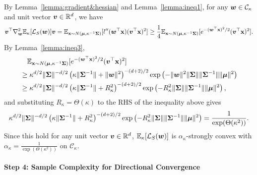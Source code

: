By Lemma~\ref{lemma:gradient&hessian} and Lemma~\ref{lemma:ineq1}, for any ${\bm{w}} \in \mathcal{C}_\kappa$ and unit vector ${\bm{v}} \in \mathbb{R}^{d}$, we have
\begin{equation*}
    {\bm{v}}^\top \nabla^2_{\bm{w}} \mathbb{E}_\kappa[\mathcal{L}_S({\bm{w}})] {\bm{v}} = \mathbb{E}_{{\mathbf{x}} \sim N({\bm{\mu}}, \kappa^{-1} {\bm{\Sigma}})}[l''({\bm{w}}^\top {\mathbf{x}}) ({\bm{v}}^\top {\mathbf{x}})^2]
    \geq \frac{1}{4} \mathbb{E}_{{\mathbf{x}} \sim N({\bm{\mu}}, \kappa^{-1}{\bm{\Sigma}})}[e^{-({\bm{w}}^\top {\mathbf{x}})^2/2}({\bm{v}}^\top {\mathbf{x}})^2].
\end{equation*}
By Lemma~\ref{lemma:ineq3}, 
\begin{align*}
    &\quad \mathbb{E}_{{\mathbf{x}} \sim N({\bm{\mu}}, \kappa^{-1}{\bm{\Sigma}})}[e^{-({\bm{w}}^\top {\mathbf{x}})^2/2}({\bm{v}}^\top {\mathbf{x}})^2]\\
    &\geq \kappa^{d/2}\lVert {\bm{\Sigma}} \rVert ^{-d/2} \left (\kappa \lVert{\bm{\Sigma}}^{-1}\rVert + \lVert {\bm{w}}\rVert^2 \right )^{-(d+2)/2} \exp \left (-\lVert {\bm{w}}\rVert^2 \lVert {\bm{\Sigma}} \rVert \lVert {\bm{\Sigma}}^{-1} \rVert \lVert {\bm{\mu}}\rVert^2 \right )\\
    &\geq \kappa^{d/2}\lVert {\bm{\Sigma}} \rVert ^{-d/2} \left (\kappa \lVert {\bm{\Sigma}}^{-1} \rVert + R_\kappa^2 \right )^{-(d+2)/2} \exp \left (-R_\kappa^2 \lVert {\bm{\Sigma}} \rVert \lVert {\bm{\Sigma}}^{-1} \rVert \lVert {\bm{\mu}}\rVert^2 \right ),
\end{align*}
and substituting $R_\kappa = \Theta (\kappa)$ to the RHS of the inequality above gives
\begin{equation*}
\kappa^{d/2}\lVert {\bm{\Sigma}} \rVert ^{-d/2} \left (\kappa \lVert {\bm{\Sigma}}^{-1} \rVert + R_\kappa^2 \right )^{-(d+2)/2} \exp \left (-R_\kappa^2 \lVert {\bm{\Sigma}} \rVert \lVert {\bm{\Sigma}}^{-1} \rVert \lVert {\bm{\mu}}\rVert^2 \right ) 
= \frac{1}{\exp(\Theta(\kappa^2))}.
\end{equation*}
Since this hold for any unit vector ${\bm{v}} \in \mathbb{R}^d$, $\mathbb{E}_\kappa [\mathcal{L}_S({\bm{w}})]$ is $\alpha_\kappa$-strongly convex with $\alpha_\kappa = \frac{1}{\exp(\Theta(\kappa^2))}$ on $\mathcal{C}_\kappa$.


\paragraph{Step 4: Sample Complexity for Directional Convergence}\quad


